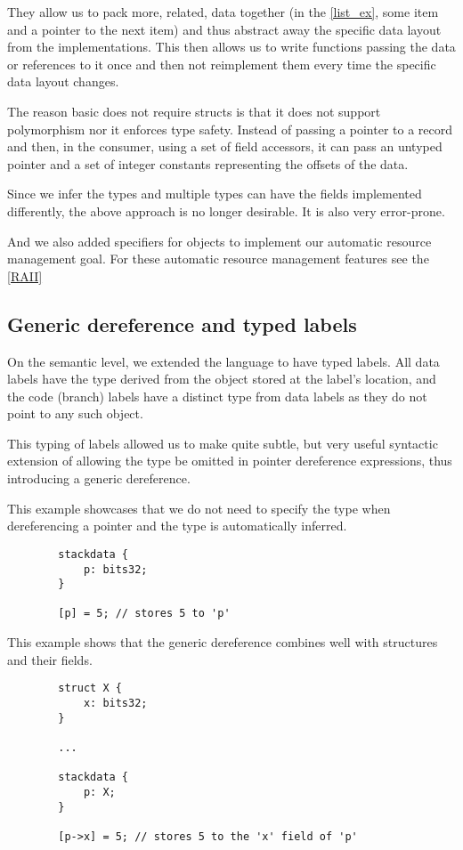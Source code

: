 They allow us to pack more, related, data together (in the \cref{list_ex}, some item and a pointer to the next item) and thus abstract away the specific data layout from the implementations. This then allows us to write functions passing the data or references to it once and then not reimplement them every time the specific data layout changes.

The reason basic \cmm{} does not require structs is that it does not support polymorphism nor it enforces type safety. Instead of passing a pointer to a record and then, in the consumer, using a set of field accessors, it can pass an untyped pointer and a set of integer constants representing the offsets of the data.

Since we infer the types and multiple types can have the fields implemented differently, the above approach is no longer desirable. It is also very error-prone.

And we also added  specifiers for  objects to implement our automatic resource management goal. For these automatic resource management features see the \cref{RAII}

\subsection{Generic dereference and typed labels}

On the semantic level, we extended the language to have typed labels. All data labels have the type derived from the object stored at the label's location, and the code (branch) labels have a distinct type from data labels as they do not point to any such object.

This typing of labels allowed us to make quite subtle, but very useful syntactic extension of allowing the type be omitted in pointer dereference expressions, thus introducing a generic dereference.

\begin{ex}
    This example showcases that we do not need to specify the type when dereferencing a pointer and the type is automatically inferred.

    \begin{lstlisting}
        stackdata {
            p: bits32;
        }

        [p] = 5; // stores 5 to 'p'
    \end{lstlisting}
\end{ex}

\begin{ex}
    This example shows that the generic dereference combines well with structures and their fields.

    \begin{lstlisting}
        struct X {
            x: bits32;
        }

        ...

        stackdata {
            p: X;
        }

        [p->x] = 5; // stores 5 to the 'x' field of 'p'
    \end{lstlisting}
\end{ex}

